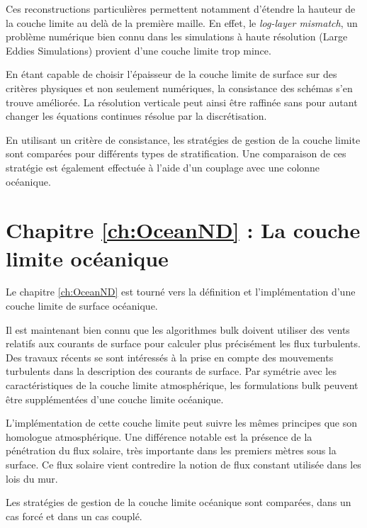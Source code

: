 Ces reconstructions particulières permettent notamment
	d'étendre la hauteur de la couche limite au delà
	de la première maille.
	En effet, le \textit{log-layer mismatch},
	un problème numérique bien connu dans les
	simulations à haute résolution (Large Eddies
	Simulations)
	provient d'une couche limite trop mince.
\par
En étant capable de choisir l'épaisseur de la couche
	limite de surface sur des critères physiques et non
	seulement numériques, la consistance des schémas
	s'en trouve améliorée. La résolution verticale
	peut ainsi être raffinée sans pour autant changer
	les équations continues résolue par la
			discrétisation.
\par
En utilisant un critère de consistance, les stratégies
	de gestion de la couche limite sont
	comparées pour différents types de stratification.
	Une comparaison de ces stratégie est également effectuée
	à l'aide d'un couplage avec une colonne océanique.
\section*{Chapitre \ref{ch:OceanND} : La couche limite océanique}
Le chapitre \ref{ch:OceanND} est tourné vers la définition et l'implémentation
d'une couche limite de surface océanique.
\par
Il est maintenant bien connu que les algorithmes
	bulk doivent utiliser des vents relatifs aux
	courants de surface pour calculer plus précisément
	les flux turbulents.
	Des travaux récents \citep{pelletier_two-sided_2021}
	se sont intéressés à la prise en compte des mouvements
	turbulents dans la description des courants de
	surface. Par symétrie avec les caractéristiques
	de la couche limite atmosphérique, les formulations
	bulk peuvent être supplémentées d'une couche
	limite océanique.
\par
L'implémentation de cette couche limite peut suivre
	les mêmes principes que son homologue atmosphérique.
	Une différence notable est la présence de la
	pénétration du flux solaire, très importante dans
	les premiers mètres sous la surface.
	Ce flux solaire vient contredire la notion de flux
	constant utilisée dans les lois du mur.
\par
Les stratégies de gestion de la couche limite
	océanique sont comparées, dans un cas forcé et
	dans un cas couplé.

